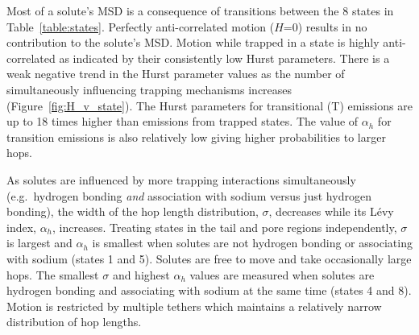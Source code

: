 \documentclass[aps,pre,preprint,groupedaddress]{revtex4-2}
\begin{document}
  Most of a solute's MSD is a consequence of transitions between the 8 states
  in Table~\ref{table:states}. Perfectly anti-correlated motion ($H$=0) results in
  no contribution to the solute's MSD. Motion while trapped in a state is highly 
  anti-correlated as indicated by their consistently low Hurst parameters.
  There is a weak negative trend in the Hurst parameter values as the number
  of simultaneously influencing trapping mechanisms increases (Figure~\ref{fig:H_v_state}). 
  The Hurst parameters for transitional (T) emissions are up to 18 times higher than
  emissions from trapped states. The value of $\alpha_h$ for 
  transition emissions is also relatively low giving higher probabilities to larger hops.
  
  As solutes are influenced by more trapping interactions simultaneously (e.g.~hydrogen
  bonding \textit{and} association with sodium versus just hydrogen bonding), the 
  width of the hop length distribution, $\sigma$, decreases while its L\'evy index,
  $\alpha_h$, increases. Treating states in the tail and pore regions independently, 
  $\sigma$ is largest and $\alpha_h$ is smallest when solutes are not hydrogen bonding
  or associating with sodium (states 1 and 5). Solutes are free to move and take 
  occasionally large hops. The smallest $\sigma$ and highest $\alpha_h$ values are
  measured when solutes are hydrogen bonding and associating with sodium at the
  same time (states 4 and 8). Motion is restricted by 
  multiple tethers which 
  maintains a relatively narrow distribution of hop lengths.
  
\end{document}
